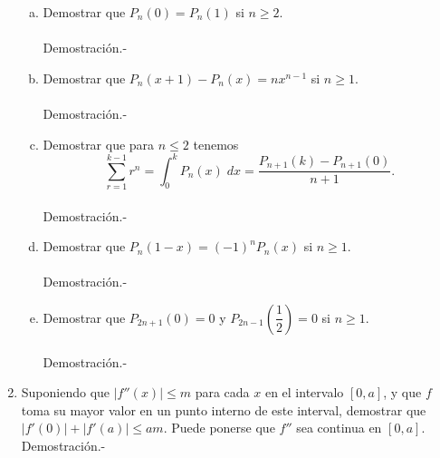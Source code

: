\begin{enumerate}[\bfseries 1.]
\begin{enumerate}[a)]
	    \item Demostrar que $P_n(0)=P_n(1)$ si $n\geq 2$.\\\\
		Demostración.-\;

	    \item Demostrar que $P_n(x+1)-P_n(x)=nx^{n-1}$ si $n\geq 1$.\\\\
		Demostración.-\;

	    \item Demostrar que para $n\leq 2$ tenemos 
	    $$\sum_{r=1}^{k-1}r^n = \int_0^k P_n(x)\; dx = \dfrac{P_{n+1}(k)-P_{n+1}(0)}{n+1}.$$\\
		Demostración.-\;

	    \item  Demostrar que $P_n(1-x)=(-1)^n P_n(x)$ si $n\geq 1$.\\\\
		Demostración.-\;

	    \item Demostrar que $P_{2n+1}(0)=0$ y $P_{2n-1}\left(\dfrac{1}{2}\right)=0$ si $n\geq 1.$\\\\
		Demostración.-\;

	\end{enumerate}

    \item Suponiendo que $|f''(x)|\leq m$ para cada $x$ en el intervalo $[0,a]$, y que $f$ toma su mayor valor en un punto interno de este interval, demostrar que $|f'(0)|+|f'(a)|\leq am$. Puede ponerse que $f''$ sea continua en $[0,a]$.
	Demostración.-\; 

\end{enumerate}

